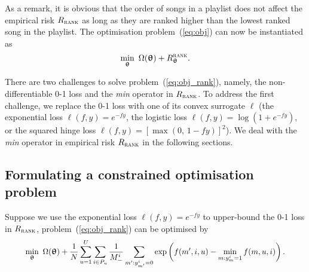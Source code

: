 As a remark, it is obvious that the order of songs in a playlist does not affect the empirical 
risk $R_\textsc{rank}$ as long as they are ranked higher than the lowest ranked song in the playlist.
The optimisation problem~(\ref{eq:obj}) can now be instantiated as 
\begin{equation}
\label{eq:obj_rank}
\min_{\bm{\uptheta}} \ \Omega({\bm{\uptheta}}) + R_{{\bm{\uptheta}}}^{\textsc{rank}}.
\end{equation}

There are two challenges to %
solve problem~(\ref{eq:obj_rank}),
namely, the non-differentiable 0-1 loss and the \emph{min} operator in $R_\textsc{rank}$.
To address the first challenge, we replace the 0-1 loss with one of its convex surrogate $\ell$
(\eg the exponential loss $\ell(f, y) = e^{-fy}$, the logistic loss $\ell(f, y) = \log(1 + e^{-fy})$,
or the squared hinge loss $\ell(f, y) = [\max(0, \, 1 - fy)]^2$).
We deal with the \emph{min} operator in empirical risk $R_\textsc{rank}$ in the following sections.




\subsection{Formulating a constrained optimisation problem}

Suppose we use the exponential loss $\ell(f, y) = e^{-fy}$ to upper-bound the 0-1 loss in $R_\textsc{rank}$,
problem~(\ref{eq:obj_rank}) can be optimised by
\begin{equation}
\label{eq:expobj_rank}
\resizebox{.9\linewidth}{!}{$\displaystyle
\min_{\upthetabm} \ \Omega(\upthetabm) + \frac{1}{N} \sum_{u=1}^U \sum_{i \in P_u} \frac{1}{M_-^i} 
                  \sum_{m': y_{m'}^i = 0} \exp \left(f(m', i, u) - \min_{m: y_m^i = 1} f(m, u, i) \right).
$}
\end{equation}

